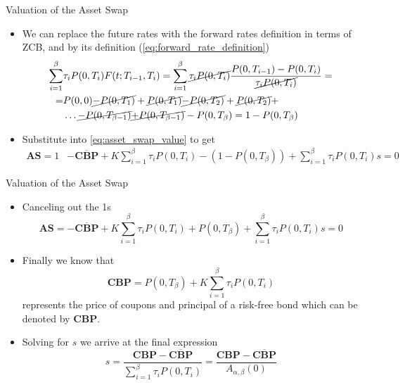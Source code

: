 \documentclass{beamer}
\begin{document}
\begin{frame}{Valuation of the Asset Swap}
	\begin{itemize}
		\item We can replace the future rates with the forward rates definition in terms of ZCB, and by its definition (\cref{eq:forward_rate_definition})
		\begin{equation*}
			\begin{aligned}
				\sum_{i=1}^\beta &\tau_i P(0,T_i)F(t;T_{i-1},T_i) =  \sum_{i=1}^\beta \cancel{\tau_i P(0,T_i)}\frac{P(0,T_{i-1})-P(0,T_i)}{\cancel{\tau_i P(0,T_i)}} = \\
				= &P(0,0) \cancel{- P(0,T_1)} + \cancel{P(0,T_1)} \cancel{- P(0,T_2)} + \cancel{P(0,T_2)} + \\
				&\ldots \cancel{- P(0, T_{\beta-1})} \cancel{+ P(0, T_{\beta-1})}-P(0,T_\beta) = 1-P(0,T_\beta)
			\end{aligned}
		\end{equation*}
		\item Substitute into \cref{eq:asset_swap_value} to get
		\begin{equation*}
			\begin{aligned}
				\textbf{AS}=1&-\overline{\textbf{CBP}}+K\sum_{i=1}^{\beta}\tau_i P(0,T_i) -(1-P(0,T_\beta))
				+ \sum_{i=1}^\beta\tau_i P(0,T_i)s=0
			\end{aligned}
		\end{equation*}
	\end{itemize}
\end{frame}

\begin{frame}{Valuation of the Asset Swap}
	\begin{itemize}
		\item Canceling out the 1s
		\begin{equation*}
			\textbf{AS}=-\overline{\textbf{CBP}}+K\sum_{i=1}^\beta\tau_i P(0,T_i) + P(0,T_\beta) + \sum_{i=1}^{\beta}\tau_i P(0,T_i)s=0
		\end{equation*}
		\item Finally we know that
		\begin{equation*}
			\textbf{CBP} = P(0,T_\beta) + K\sum_{i=1}^\beta\tau_i P(0,T_i)
		\end{equation*}
		represents the price of coupons and principal of a  risk-free bond which can be denoted by \textbf{CBP}.
		\item Solving for $s$ we arrive at the final expression
		\begin{equation}
			\boxed{s = \frac{\textbf{CBP}-\overline{\textbf{CBP}}}{\sum_{i=1}^{\beta}\tau_iP(0,T_i)} =  \frac{\textbf{CBP} - \overline{\textbf{CBP}}}{A_{\alpha,\beta}(0)}}
		\end{equation}
		\myendproof
	\end{itemize}
\end{frame}
\end{document}
